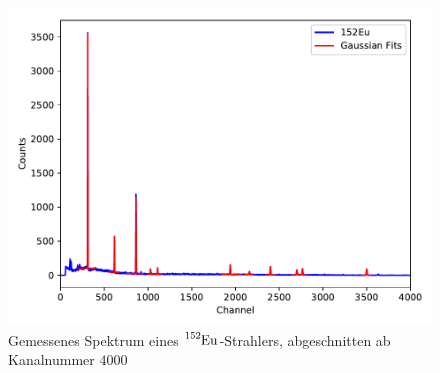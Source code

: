 \begin{figure}[H]
  \centering
  \includegraphics[scale=0.7]{content/plot1.pdf}
  \caption{Gemessenes Spektrum eines $\ce{^{152}Eu}$-Strahlers, abgeschnitten ab Kanalnummer $\num{4000}$}
  \label{fig:plot1}
\end{figure}

